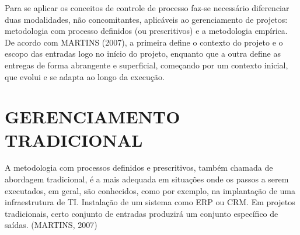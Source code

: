 Para se aplicar os conceitos de controle de processo faz-se necessário diferenciar duas modalidades, não concomitantes, aplicáveis ao gerenciamento de projetos: metodologia com processo definidos (ou prescritivos) e a metodologia empírica. De acordo com MARTINS (2007), a primeira define o contexto do projeto e o escopo das entradas logo no início do projeto, enquanto que a outra define as entregas de forma abrangente e superficial, começando por um contexto inicial, que evolui e se adapta ao longo da execução.

\section{GERENCIAMENTO TRADICIONAL}
A metodologia com processos definidos e prescritivos, também chamada de abordagem tradicional, é a mais adequada em situações onde os passos a serem executados, em geral, são conhecidos, como por exemplo, na implantação de uma infraestrutura de TI. Instalação de um sistema como ERP ou CRM. Em projetos tradicionais, certo conjunto de entradas produzirá um conjunto específico de saídas. (MARTINS, 2007)

